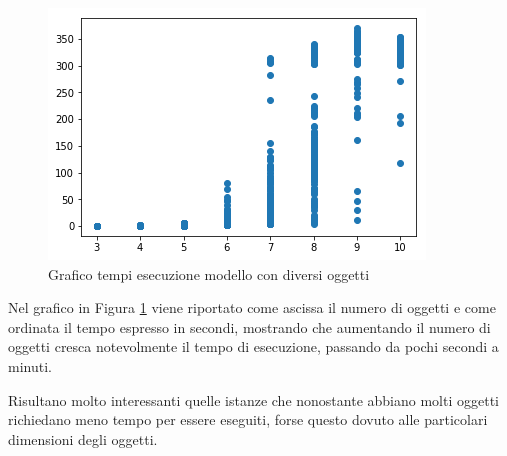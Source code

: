 \begin{figure}[!ht]
	\begin{center} \includegraphics[scale=0.8]{figures/time_nitems}
		\caption[Grafico tempi esecuzione]{Grafico tempi esecuzione modello con diversi oggetti}  
		\label{fig:times}
	\end{center}
\end{figure}

Nel grafico in Figura \ref{fig:times} viene riportato come ascissa il numero di oggetti e come ordinata il tempo espresso in secondi, mostrando che aumentando il numero di oggetti cresca notevolmente il tempo di esecuzione, passando da pochi secondi a minuti.

Risultano molto interessanti quelle istanze che nonostante abbiano molti oggetti richiedano meno tempo per essere eseguiti, forse questo dovuto alle particolari dimensioni degli oggetti.

